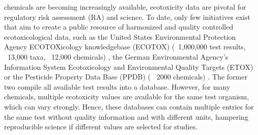 chemicals are becoming increasingly available, ecotoxicity data are pivotal for regulatory risk assessment (RA) and science. To date, only few initiatives exist that aim to create a public resource of harmonized and quality controlled ecotoxicological data, such as the United States Environmental Protection Agency ECOTOXicology knowledgebase (ECOTOX) (~1,000,000 test results, ~13,000 taxa, ~12,000 chemicals) \citep{elonen_ecotoxicology_2018}, the German Environmental Agency's Information System Ecotoxicology and Environmental Quality Targets (ETOX) \citep{umweltbundesamt_etox_2019} or the Pesticide Property Data Base (PPDB) (~ 2000 chemicals) \citep{lewis_international_2016}. The former two compile all available test results into a database. However, for many chemicals, multiple ecotoxicity values are available for the same test organism, which can vary strongly. Hence, these databases can contain multiple entries for the same test without quality information and with different units, hampering reproducible science if different values are selected for studies. 


